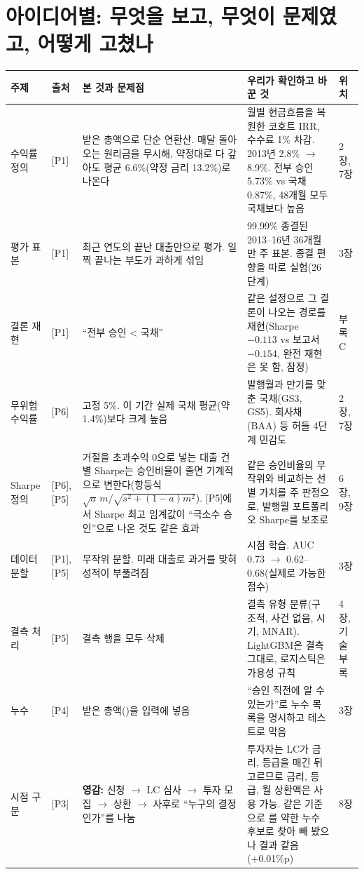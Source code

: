 \section*{아이디어별: 무엇을 보고, 무엇이 문제였고, 어떻게 고쳤나}
\begin{table}[H]\centering\footnotesize
\begin{tabularx}{\linewidth}{@{}p{20mm}p{12mm}LLp{12mm}@{}}\toprule
주제 & 출처 & 본 것과 문제점 & 우리가 확인하고 바꾼 것 & 위치\\\midrule
수익률 정의 & [P1] & 받은 총액으로 단순 연환산. 매달 돌아오는 원리금을 무시해, 약정대로 다 갚아도 평균 6.6\%(약정 금리 13.2\%)로 나온다 & 월별 현금흐름을 복원한 코호트 IRR, 수수료 1\% 차감. 2013년 2.8\% \ensuremath{\to} 8.9\%. 전부 승인 5.73\% vs 국채 0.87\%, 48개월 모두 국채보다 높음 & 2장, 7장\\
평가 표본 & [P1] & 최근 연도의 끝난 대출만으로 평가. 일찍 끝나는 부도가 과하게 섞임 & 99.99\% 종결된 2013--16년 36개월만 주 표본. 종결 편향을 따로 실험(26단계) & 3장\\
결론 재현 & [P1] & ``전부 승인 < 국채'' & 같은 설정으로 그 결론이 나오는 경로를 재현(Sharpe $-0.113$ vs 보고서 $-0.154$, 완전 재현은 못 함, 잠정) & 부록 C\\
무위험 수익률 & [P6] & 고정 5\%. 이 기간 실제 국채 평균(약 1.4\%)보다 크게 높음 & 발행월과 만기를 맞춘 국채(GS3, GS5). 회사채(BAA) 등 허들 4단계 민감도 & 2장, 7장\\
Sharpe 정의 & [P6], [P5] & 거절을 초과수익 0으로 넣는 대출 건별 Sharpe는 승인비율이 줄면 기계적으로 변한다(항등식 $\sqrt{a}\,m/\sqrt{s^2+(1-a)m^2}$). [P5]에서 Sharpe 최고 임계값이 ``극소수 승인''으로 나온 것도 같은 효과 & 같은 승인비율의 무작위와 비교하는 선별 가치를 주 판정으로, 발행월 포트폴리오 Sharpe를 보조로 & 6장, 9장\\
데이터 분할 & [P1], [P5] & 무작위 분할. 미래 대출로 과거를 맞혀 성적이 부풀려짐 & 시점 학습. AUC 0.73 \ensuremath{\to} 0.62--0.68(실제로 가능한 점수) & 3장\\
결측 처리 & [P5] & 결측 행을 모두 삭제 & 결측 유형 분류(구조적, 사건 없음, 시기, MNAR). LightGBM은 결측 그대로, 로지스틱은 가용성 규칙 & 4장, 기술 부록\\
누수 & [P4] & 받은 총액()을 입력에 넣음 & ``승인 직전에 알 수 있는가''로 누수 목록을 명시하고 테스트로 막음 & 3장\\
시점 구분 & [P3] & \textbf{영감:} 신청 \ensuremath{\to} LC 심사 \ensuremath{\to} 투자 모집 \ensuremath{\to} 상환 \ensuremath{\to} 사후로 ``누구의 결정인가''를 나눔 & 투자자는 LC가 금리, 등급을 매긴 뒤 고르므로 금리, 등급, 월 상환액은 사용 가능. 같은 기준으로 를 약한 누수 후보로 찾아 빼 봤으나 결과 같음(+0.01\%p) & 8장\\

\end{tabularx}
\end{table}
